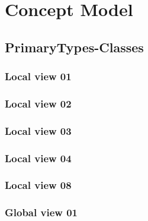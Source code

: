 
\chapter{Concept Model}
\label{chap:lu.uni.lassy.excalibur.examples.icrash-CM}


\section{PrimaryTypes-Classes}
\subsection{Local view 01}
\label{sec:lu.uni.lassy.excalibur.examples.icrash-CM-view-local-PrimaryTypes-Classes-01}

\subsection{Local view 02}
\label{sec:lu.uni.lassy.excalibur.examples.icrash-CM-view-local-PrimaryTypes-Classes-02}

\subsection{Local view 03}
\label{sec:lu.uni.lassy.excalibur.examples.icrash-CM-view-local-PrimaryTypes-Classes-03}

\subsection{Local view 04}
\label{sec:lu.uni.lassy.excalibur.examples.icrash-CM-view-local-PrimaryTypes-Classes-04}

\subsection{Local view 08}
\label{sec:lu.uni.lassy.excalibur.examples.icrash-CM-view-local-PrimaryTypes-Classes-08}


\subsection{Global view 01}
\label{sec:lu.uni.lassy.excalibur.examples.icrash-CM-view-global-PrimaryTypes-Classes-01}



